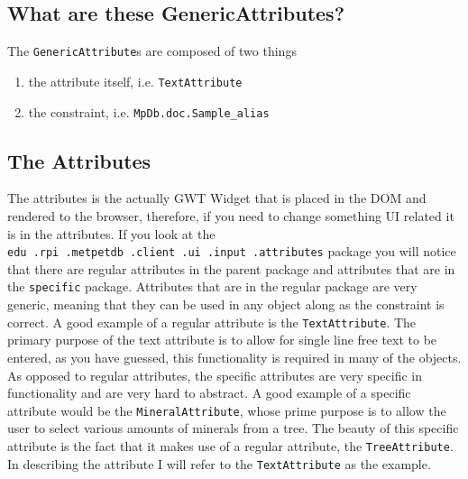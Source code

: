 \documentclass[10pt,letterpaper,onecolumn,oneside]{report}
\begin{document}
\subsection{What are these GenericAttributes?}
The \texttt{GenericAttribute}s are composed of two things
\begin{enumerate}
\item the attribute itself, i.e. \texttt{TextAttribute}
\item the constraint, i.e. \texttt{MpDb.doc.Sample\_alias}
\end{enumerate}
\subsection{The Attributes}
The attributes is the actually GWT Widget that is placed in the DOM and
rendered to the browser, therefore, if you need to change something UI
related it is in the attributes.  If you look at the
\texttt{edu\ .rpi\ .metpetdb\ .client\ .ui\ .input\ .attributes} package
you will notice that there are regular attributes in the parent package
and attributes that are in the \texttt{specific} package.  Attributes
that are in the regular package are very generic, meaning that they can
be used in any object along as the constraint is correct.
A good example of a regular attribute is the \texttt{TextAttribute}.  
The primary purpose of the text attribute is to allow for single line
free text to be entered, as you have guessed, this functionality is
required in many of the objects.  As opposed to regular attributes, the
specific attributes are very specific in functionality and are
very hard to abstract.  A good example of a specific attribute would
be the \texttt{MineralAttribute}, whose prime purpose is to allow
the user to select various amounts of minerals from a tree.  The beauty
of this specific attribute is the fact that it makes use of a regular
attribute, the \texttt{TreeAttribute}.  In describing the attribute I
will refer to the \texttt{TextAttribute} as the example.
\end{document}
